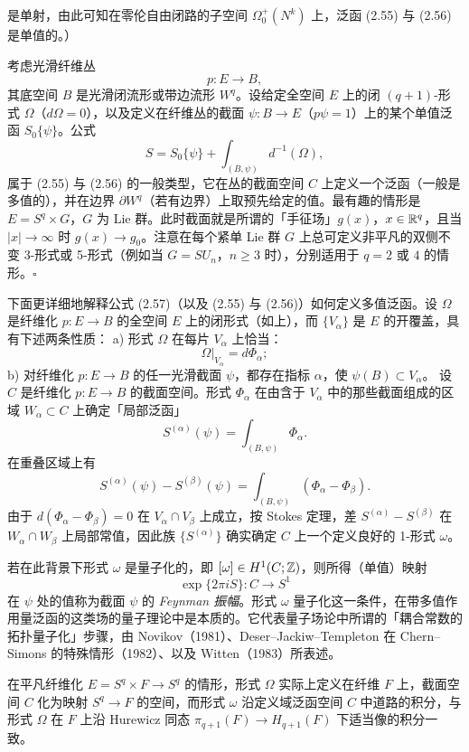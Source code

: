 是单射，由此可知在零伦自由闭路的子空间 $\Omega^+_0(N^k)$ 上，泛函 (2.55) 与 (2.56) 是单值的。）

 考虑光滑纤维丛
\[
  p:E\to B,
\]
其底空间 $B$ 是光滑闭流形或带边流形 $W^q$。设给定全空间 $E$ 上的闭 $(q+1)$-形式 $\Omega$（$d\Omega=0$），以及定义在纤维丛的截面 $\psi:B\to E$（$p\psi=1$）上的某个单值泛函 $S_0\{\psi\}$。公式
\begin{equation}
  S=S_0\{\psi\}+\int_{(B,\psi)}d^{-1}(\Omega), \tag{2.57}
\end{equation}
属于 (2.55) 与 (2.56) 的一般类型，它在丛的截面空间 $C$ 上定义一个泛函（一般是多值的），并在边界 $\partial W^q$（若有边界）上取预先给定的值。最有趣的情形是 $E=S^q\times G$，$G$ 为 Lie 群。此时截面就是所谓的「手征场」$g(x)$，$x\in\mathbb{R}^q$，且当 $|x|\to\infty$ 时 $g(x)\to g_0$。注意在每个紧单 Lie 群 $G$ 上总可定义非平凡的双侧不变 3-形式或 5-形式（例如当 $G=SU_n$，$n\ge3$ 时），分别适用于 $q=2$ 或 $4$ 的情形。\hfill$\square$

下面更详细地解释公式 (2.57)（以及 (2.55) 与 (2.56)）如何定义多值泛函。设 $\Omega$ 是纤维化 $p:E\to B$ 的全空间 $E$ 上的闭形式（如上），而 $\{V_\alpha\}$ 是 $E$ 的开覆盖，具有下述两条性质：
a) 形式 $\Omega$ 在每片 $V_\alpha$ 上恰当：
\[
  \Omega|_{V_\alpha}=d\Phi_\alpha;
\]
b) 对纤维化 $p:E\to B$ 的任一光滑截面 $\psi$，都存在指标 $\alpha$，使 $\psi(B)\subset V_\alpha$。
设 $C$ 是纤维化 $p:E\to B$ 的截面空间。形式 $\Phi_\alpha$ 在由含于 $V_\alpha$ 中的那些截面组成的区域 $W_\alpha\subset C$ 上确定「局部泛函」
\[
  S^{(\alpha)}(\psi)=\int_{(B,\psi)}\Phi_\alpha.
\]
在重叠区域上有
\[
  S^{(\alpha)}(\psi)-S^{(\beta)}(\psi)=\int_{(B,\psi)}(\Phi_\alpha-\Phi_\beta).
\]
由于 $d(\Phi_\alpha-\Phi_\beta)=0$ 在 $V_\alpha\cap V_\beta$ 上成立，按 Stokes 定理，差 $S^{(\alpha)}-S^{(\beta)}$ 在 $W_\alpha\cap W_\beta$ 上局部常值，因此族 $\{S^{(\alpha)}\}$ 确实确定 $C$ 上一个定义良好的 1-形式 $\omega$。

若在此背景下形式 $\omega$ 是量子化的，即 $[\omega]\in H^1(C;\mathbb{Z})$，则所得（单值）映射
\[
  \exp\{2\pi iS\}:C\to S^1
\]
在 $\psi$ 处的值称为截面 $\psi$ 的 \emph{Feynman 振幅}。形式 $\omega$ 量子化这一条件，在带多值作用量泛函的这类场的量子理论中是本质的。它代表量子场论中所谓的「耦合常数的拓扑量子化」步骤，由 Novikov（1981）、Deser--Jackiw--Templeton 在 Chern--Simons 的特殊情形（1982）、以及 Witten（1983）所表述。

在平凡纤维化 $E=S^q\times F\to S^q$ 的情形，形式 $\Omega$ 实际上定义在纤维 $F$ 上，截面空间 $C$ 化为映射 $S^q\to F$ 的空间，而形式 $\omega$ 沿定义域泛函空间 $C$ 中道路的积分，与形式 $\Omega$ 在 $F$ 上沿 Hurewicz 同态 $\pi_{q+1}(F)\to H_{q+1}(F)$ 下适当像的积分一致。

